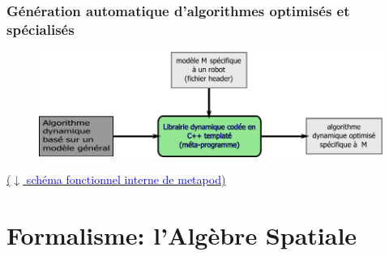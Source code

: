\documentclass[10pt]{beamer}
\begin{document}
\begin{frame}
  \frametitle{Génération automatique d'algorithmes optimisés et spécialisés}
  
	\begin{figure}[H]
	\begin{center}
	\includegraphics[width=\textwidth]{figs/principeAlgoGenerique.pdf}
	\label{fig_generationAlgoAutomatique}
	\end{center}
	\end{figure}
  
	
	\bigskip
	\href{run:/home/nuno/Documents/Stage/Soutenance/figs/archiMetapod.pdf}
	{($\downarrow$ \textcolor{blue}{schéma fonctionnel interne de metapod})}

\end{frame}


\section{Formalisme: l'Algèbre Spatiale}
\end{document}
